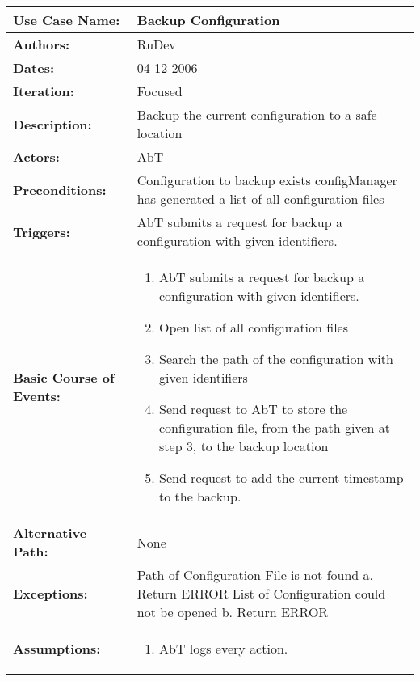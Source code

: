 \begin{tabularx}{\linewidth}{|l|X|}
\hline
\textbf{Use Case Name:} & \textbf{Backup Configuration} \\
\hline
\textbf{Authors:} & RuDev \\
\hline
\textbf{Dates:} & 04-12-2006 \\
\hline
\textbf{Iteration:} & Focused \\
\hline
\textbf{Description:} & Backup the current configuration to a safe location\\
\hline
\textbf{Actors:} & AbT \\
\hline
\textbf{Preconditions:} & Configuration to backup exists \newline configManager has generated a list of all configuration files  \\
\hline
\textbf{Triggers:} & AbT submits a request for backup a configuration with given identifiers. \\
\hline
\textbf{Basic Course of Events:} & 
\begin{minipage}{\linewidth} 
  \vspace{0.05em}
  \begin{enumerate}
   \item AbT submits a request for backup a configuration with given identifiers.
   \item Open list of all configuration files
   \item Search the path of the configuration with given identifiers
   \item Send request to AbT to store the configuration file, from the path given at step 3, to the backup location
   \item Send request to add the current timestamp to the backup.
  \end{enumerate}
  \vspace{0.05em}
\end{minipage}
\\
\hline 
\textbf{Alternative Path:} & None \\
\hline
\textbf{Exceptions:} & Path of Configuration File is not found \newline a. Return ERROR \newline \newline List of Configuration could not be opened \newline b. Return ERROR \\
\hline
\textbf{Assumptions:} & \begin{enumerate} 
							\item AbT logs every action.

\end{enumerate}
\end{tabularx}
